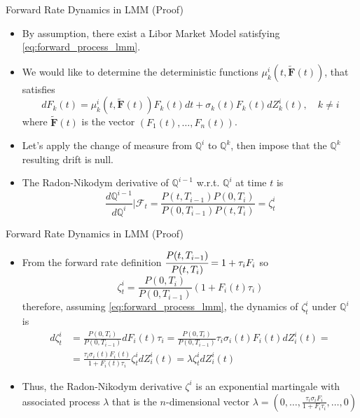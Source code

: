 \documentclass{beamer}
\begin{document}
\begin{frame}{Forward Rate Dynamics in LMM (Proof)}
  \begin{itemize}
  \item<1-> By assumption, there exist a Libor Market Model satisfying \cref{eq:forward_process_lmm}.
  \item<2-> We would like to determine the deterministic functions $\mu_k^i(t, \bm{\tilde{F}}(t))$, that satisfies
    \begin{equation}
      dF_k(t) = \mu_k^i(t, \bm{\tilde{F}}(t))F_k(t)dt + \sigma_k(t)F_k(t)dZ^i_k(t),\quad k\neq i
      \label{eq:forward_dynamics_in_lfm}
    \end{equation}
 where $\bm{\tilde{F}}(t)$ is the vector $(F_1(t),\ldots, F_n(t))$.
  \item<3-> Let's apply the change of measure from $\mathbb{Q}^i$ to $\mathbb{Q}^k$, then impose that the $\mathbb{Q}^k$ resulting drift is null. 
  \item<4-> The Radon-Nikodym derivative of $\mathbb{Q}^{i-1}$ w.r.t. $\mathbb{Q}^i$ at time $t$ is
    \begin{equation*}
      \frac{d\mathbb{Q}^{i-1}}{d\mathbb{Q}^i}\bigg|\mathcal{F}_t = \frac{P(t, T_{i-1})P(0, T_i)}{P(0, T_{i-1})P(t, T_i)} = \zeta^i_t
    \end{equation*}
  \end{itemize}
\end{frame}

\begin{frame}{Forward Rate Dynamics in LMM (Proof)}
  \begin{itemize}
  \item<1-> From the forward rate definition $\cfrac{P(t,T_{i-1})}{P(t,T_i)} = 1 + \tau_i F_i$ so
    \begin{equation*}
      \zeta^i_t = \frac{P(0, T_i)}{P(0, T_{i-1})}(1+F_i(t)\tau_i)
    \end{equation*}
    therefore, assuming \cref{eq:forward_process_lmm}, the dynamics of $\zeta^i_t$ under $\mathbb{Q}^i$ is
    \begin{equation*}
      \begin{aligned}
	d\zeta^i_t &= \frac{P(0, T_i)}{P(0, T_{i-1})}dF_i(t)\tau_i = \frac{P(0, T_i)}{P(0, T_{i-1})}\tau_i\sigma_i(t)F_i(t)dZ^i_i(t) = \\ &= \frac{\tau_i\sigma_i(t)F_i(t)}{1+F_i(t)\tau_i}\zeta_t^idZ^i_i(t)=\lambda \zeta_t^idZ^i_i(t)
      \end{aligned}
    \end{equation*}
  \item<2-> Thus, the Radon-Nikodym derivative $\zeta^i$ is an exponential martingale with associated process $\lambda$ that is the $n$-dimensional vector $\lambda = \left(0,\ldots,\frac{\tau_i\sigma_iF_i}{1+F_i\tau_i},\ldots, 0\right)$
  \end{itemize}
\end{frame}
\end{document}
